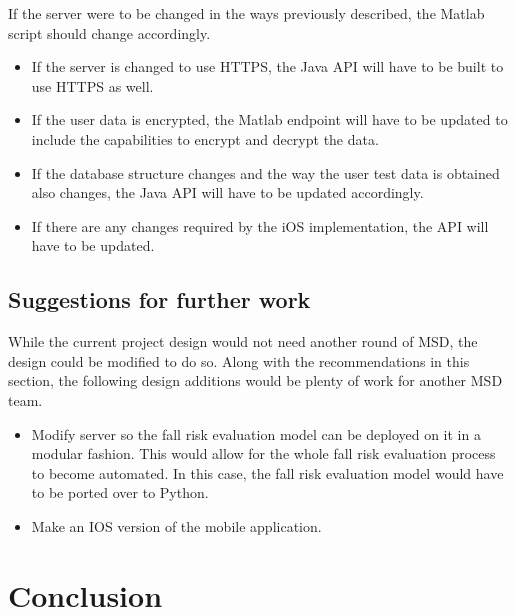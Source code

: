 \documentclass[conference]{IEEEtran}
\begin{document}
If the server were to be changed in the ways previously described, the Matlab script should change accordingly.

\begin{itemize}
    \item If the server is changed to use HTTPS, the Java API will have to be built to use HTTPS as well.
    \item If the user data is encrypted, the Matlab endpoint will have to be updated to include the capabilities to encrypt and decrypt the data.
    \item If the database structure changes and the way the user test data is obtained also changes, the Java API will have to be updated accordingly. 
    \item If there are any changes required by the iOS implementation, the API will have to be updated. 
\end{itemize}

\subsection{Suggestions for further work}

While the current project design would not need another round of MSD, the design could be modified to do so. Along with the recommendations in this section, the following design additions would be plenty of work for another MSD team.

\begin{itemize}
    \item Modify server so the fall risk evaluation model can be deployed on it in a modular fashion. This would allow for the whole fall risk evaluation process to become automated. In this case, the fall risk evaluation model would have to be ported over to Python.
    \item Make an IOS version of the mobile application.
\end{itemize}

\section{Conclusion}
\end{document}
